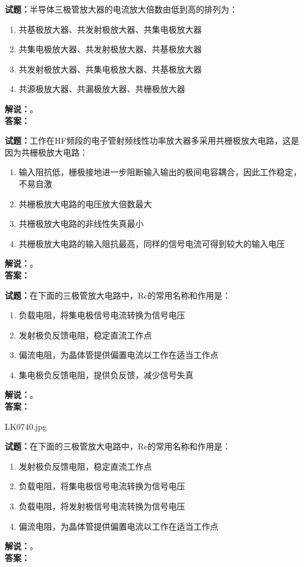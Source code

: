 \documentclass{ctexbook}
\begin{document}
\bigskip

\noindent\textbf{试题：}半导体三极管放大器的电流放大倍数由低到高的排列为：
\begin{enumerate}[leftmargin=3em]
  \item 共基极放大器、共发射极放大器、共集电极放大器
  \item 共集电极放大器、共发射极放大器、共基极放大器
  \item 共发射极放大器、共集电极放大器、共基极放大器
  \item 共源极放大器、共漏极放大器、共栅极放大器
\end{enumerate}
\noindent\textbf{解说：}\textbf{}。\\\noindent\textbf{答案：}

\bigskip

\noindent\textbf{试题：}工作在HF频段的电子管射频线性功率放大器多采用共栅极放大电路，这是因为共栅极放大电路：
\begin{enumerate}[leftmargin=3em]
  \item 输入阻抗低，栅极接地进一步阻断输入输出的极间电容耦合，因此工作稳定，不易自激
  \item 共栅极放大电路的电压放大倍数最大
  \item 共栅极放大电路的非线性失真最小
  \item 共栅极放大电路的输入阻抗最高，同样的信号电流可得到较大的输入电压
\end{enumerate}
\noindent\textbf{解说：}\textbf{}。\\\noindent\textbf{答案：}

\bigskip

\noindent\textbf{试题：}在下面的三极管放大电路中，Rc的常用名称和作用是：
\begin{enumerate}[leftmargin=3em]
  \item 负载电阻，将集电极信号电流转换为信号电压
  \item 发射极负反馈电阻，稳定直流工作点
  \item 偏流电阻，为晶体管提供偏置电流以工作在适当工作点
  \item 集电极负反馈电阻，提供负反馈，减少信号失真
\end{enumerate}
\noindent\textbf{解说：}\textbf{}。\\\noindent\textbf{答案：}

\bigskip

LK0740.jpg

\noindent\textbf{试题：}在下面的三极管放大电路中，Re的常用名称和作用是：
\begin{enumerate}[leftmargin=3em]
  \item 发射极负反馈电阻，稳定直流工作点
  \item 负载电阻，将集电极信号电流转换为信号电压
  \item 负载电阻，将发射极信号电流转换为信号电压
  \item 偏流电阻，为晶体管提供偏置电流以工作在适当工作点
\end{enumerate}
\noindent\textbf{解说：}\textbf{}。\\\noindent\textbf{答案：}
\end{document}
